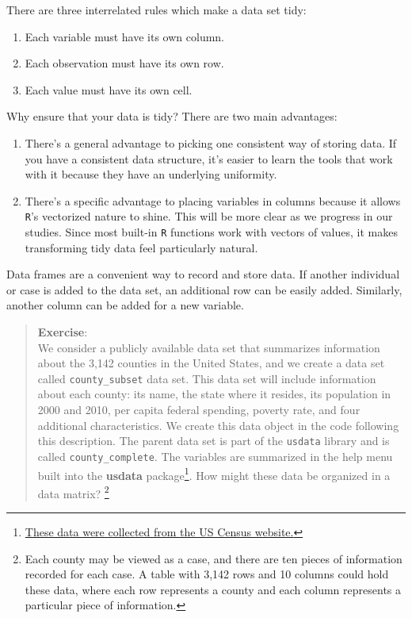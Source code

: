 \documentclass[
  letterpaper,
  DIV=11,
  numbers=noendperiod]{scrreprt}
\providecommand{\tightlist}{%
  \setlength{\itemsep}{0pt}\setlength{\parskip}{0pt}}\usepackage{longtable,booktabs,array}
\begin{document}
There are three interrelated rules which make a data set tidy:

\begin{enumerate}
\def\labelenumi{\arabic{enumi}.}
\tightlist
\item
  Each variable must have its own column.\\
\item
  Each observation must have its own row.\\
\item
  Each value must have its own cell.
\end{enumerate}

Why ensure that your data is tidy? There are two main advantages:

\begin{enumerate}
\def\labelenumi{\arabic{enumi}.}
\item
  There's a general advantage to picking one consistent way of storing
  data. If you have a consistent data structure, it's easier to learn
  the tools that work with it because they have an underlying
  uniformity.
\item
  There's a specific advantage to placing variables in columns because
  it allows \texttt{R}'s vectorized nature to shine. This will be more
  clear as we progress in our studies. Since most built-in \texttt{R}
  functions work with vectors of values, it makes transforming tidy data
  feel particularly natural.
\end{enumerate}

Data frames are a convenient way to record and store data. If another
individual or case is added to the data set, an additional row can be
easily added. Similarly, another column can be added for a new variable.

\begin{quote}
\textbf{Exercise}:\\
We consider a publicly available data set that summarizes information
about the 3,142 counties in the United States, and we create a data set
called \texttt{county\_subset} data set. This data set will include
information about each county: its name, the state where it resides, its
population in 2000 and 2010, per capita federal spending, poverty rate,
and four additional characteristics. We create this data object in the
code following this description. The parent data set is part of the
\texttt{usdata} library and is called \texttt{county\_complete}. The
variables are summarized in the help menu built into the \textbf{usdata}
package\footnote{\href{http://quickfacts.census.gov/qfd/index.html}{These
  data were collected from the US Census website.}}. How might these
data be organized in a data matrix? \footnote{Each county may be viewed
  as a case, and there are ten pieces of information recorded for each
  case. A table with 3,142 rows and 10 columns could hold these data,
  where each row represents a county and each column represents a
  particular piece of information.}
\end{quote}
\end{document}

